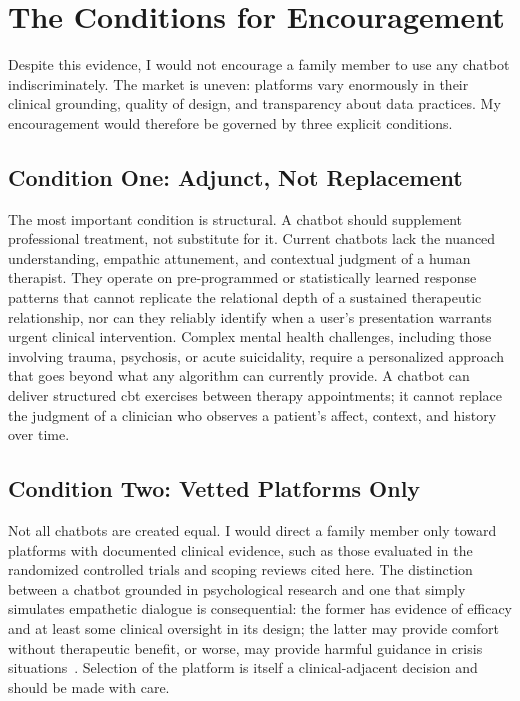 \documentclass[11pt,showkeys]{essay}
\begin{document}
\section{The Conditions for Encouragement}

Despite this evidence, I would not encourage a family member to use any chatbot indiscriminately. The market is uneven: platforms vary enormously in their clinical grounding, quality of design, and transparency about data practices. My encouragement would therefore be governed by three explicit conditions.

\subsection{Condition One: Adjunct, Not Replacement}

The most important condition is structural. A chatbot should supplement professional treatment, not substitute for it. Current chatbots lack the nuanced understanding, empathic attunement, and contextual judgment of a human therapist. They operate on pre-programmed or statistically learned response patterns that cannot replicate the relational depth of a sustained therapeutic relationship, nor can they reliably identify when a user's presentation warrants urgent clinical intervention. Complex mental health challenges, including those involving trauma, psychosis, or acute suicidality, require a personalized approach that goes beyond what any algorithm can currently provide. A chatbot can deliver structured \gls{cbt} exercises between therapy appointments; it cannot replace the judgment of a clinician who observes a patient's affect, context, and history over time.

\subsection{Condition Two: Vetted Platforms Only}

Not all chatbots are created equal. I would direct a family member only toward platforms with documented clinical evidence, such as those evaluated in the randomized controlled trials and scoping reviews cited here. The distinction between a chatbot grounded in psychological research and one that simply simulates empathetic dialogue is consequential: the former has evidence of efficacy and at least some clinical oversight in its design; the latter may provide comfort without therapeutic benefit, or worse, may provide harmful guidance in crisis situations~\cite{khawaja_your_2023}. Selection of the platform is itself a clinical-adjacent decision and should be made with care.
\end{document}

